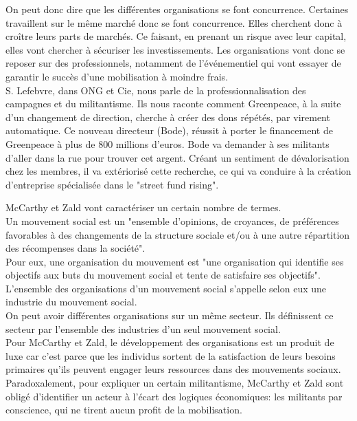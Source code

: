\documentclass[10pt, a4paper, openany]{book}
\begin{document}
On peut donc dire que les différentes organisations se font concurrence. Certaines travaillent sur le même marché donc se font concurrence. Elles cherchent donc à croître leurs parts de marchés. Ce faisant, en prenant un risque avec leur capital, elles vont chercher à sécuriser les investissements. Les organisations vont donc se reposer sur des professionnels, notamment de l'événementiel qui vont essayer de garantir le succès d'une mobilisation à moindre frais. \\
S. Lefebvre, dans ONG et Cie, nous parle de la professionnalisation des campagnes et du militantisme. Ils nous raconte comment Greenpeace, à la suite d'un changement de direction, cherche à créer des dons répétés, par virement automatique. Ce nouveau directeur (Bode), réussit à porter le financement de Greenpeace à plus de 800 millions d'euros. Bode va demander à ses militants d'aller dans la rue pour trouver cet argent. Créant un sentiment de dévalorisation chez les membres, il va extériorisé cette recherche, ce qui va conduire à la création d'entreprise spécialisée dans le "street fund rising".


McCarthy et Zald vont caractériser un certain nombre de termes. \\
Un mouvement social est un "ensemble d'opinions, de croyances, de préférences favorables à des changements de la structure sociale et/ou à une autre répartition des récompenses dans la société". \\
Pour eux, une organisation du mouvement est "une organisation qui identifie ses objectifs aux buts du mouvement social et tente de satisfaire ses objectifs". \\
L'ensemble des organisations d'un mouvement social s'appelle selon eux une industrie du mouvement social. \\
On peut avoir différentes organisations sur un même secteur. Ils définissent ce secteur par l'ensemble des industries d'un seul mouvement social. \\
Pour McCarthy et Zald, le développement des organisations est un produit de luxe car c'est parce que les individus sortent de la satisfaction de leurs besoins primaires qu'ils peuvent engager leurs ressources dans des mouvements sociaux. \\
Paradoxalement, pour expliquer un certain militantisme, McCarthy et Zald sont obligé d'identifier un acteur à l'écart des logiques économiques: les militants par conscience, qui ne tirent aucun profit de la mobilisation. 
\end{document}
